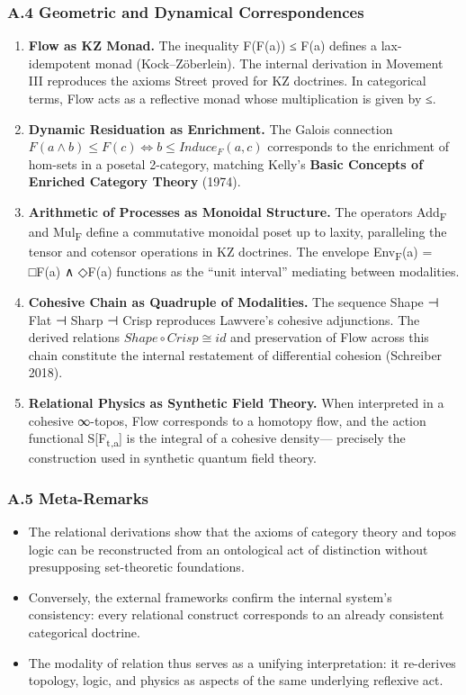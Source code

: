 \documentclass[11pt]{article}
\begin{document}
\subsubsection*{A.4 Geometric and Dynamical Correspondences}
\label{sec:orgcec0cdb}
\begin{enumerate}
\item \textbf{\textbf{Flow as KZ Monad.}}  
The inequality F(F(a)) ≤ F(a) defines a lax-idempotent monad (Kock–Zöberlein).  
The internal derivation in Movement III reproduces the axioms Street proved for KZ doctrines.  
In categorical terms, Flow acts as a reflective monad whose multiplication is given by ≤.

\item \textbf{\textbf{Dynamic Residuation as Enrichment.}}  
The Galois connection  
\(F(a ∧ b) ≤ F(c) \iff b ≤ Induce_F(a,c)\)  
corresponds to the enrichment of hom-sets in a posetal 2-category,  
matching Kelly’s \textbf{Basic Concepts of Enriched Category Theory} (1974).

\item \textbf{\textbf{Arithmetic of Processes as Monoidal Structure.}}  
The operators Add\textsubscript{F} and Mul\textsubscript{F} define a commutative monoidal poset up to laxity,  
paralleling the tensor and cotensor operations in KZ doctrines.  
The envelope Env\textsubscript{F}(a) = □F(a) ∧ ◇F(a) functions as the “unit interval” mediating between modalities.

\item \textbf{\textbf{Cohesive Chain as Quadruple of Modalities.}}  
The sequence Shape ⊣ Flat ⊣ Sharp ⊣ Crisp reproduces Lawvere’s cohesive adjunctions.  
The derived relations \(Shape ∘ Crisp ≅ id\) and preservation of Flow across this chain  
constitute the internal restatement of differential cohesion (Schreiber 2018).

\item \textbf{\textbf{Relational Physics as Synthetic Field Theory.}}  
When interpreted in a cohesive ∞-topos, Flow corresponds to a homotopy flow,  
and the action functional S[F\textsubscript{t,a}] is the integral of a cohesive density—  
precisely the construction used in synthetic quantum field theory.
\end{enumerate}
\subsubsection*{A.5 Meta-Remarks}
\label{sec:org4dd96e1}
\begin{itemize}
\item The relational derivations show that the axioms of category theory and topos logic  
can be reconstructed from an ontological act of distinction without presupposing set-theoretic foundations.
\item Conversely, the external frameworks confirm the internal system’s consistency:  
every relational construct corresponds to an already consistent categorical doctrine.
\item The modality of relation thus serves as a unifying interpretation:  
it re-derives topology, logic, and physics as aspects of the same underlying reflexive act.
\end{itemize}
\end{document}
